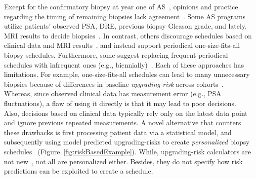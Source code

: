 Except for the confirmatory biopsy at year one of AS~\citep{bokhorst2015compliance}, opinions and practice regarding the timing of remaining biopsies lack agreement~\citep{nieboer2018active}. Some AS programs utilize patients' observed PSA, DRE, previous biopsy Gleason grade, and lately, MRI results to decide biopsies~\citep{kasivisvanathan2020magnetic,bul2013active,nieboer2018active}. In contrast, others discourage schedules based on clinical data and MRI results~\citep{chesnut2019role,loeb2014heterogeneity}, and instead support periodical one-size-fits-all biopsy schedules. Furthermore, some suggest replacing frequent periodical schedules with infrequent ones (e.g., biennially)~\citep{inoue2018comparative,de2017estimating}. Each of these approaches has limitations. For example, one-size-fits-all schedules can lead to many unnecessary biopsies because of differences in baseline \emph{upgrading-risk} across cohorts~\citep{inoue2018comparative}. Whereas, since observed clinical data has measurement error (e.g., PSA fluctuations), a flaw of using it directly is that it may lead to poor decisions. Also, decisions based on clinical data typically rely only on the latest data point and ignore previous repeated measurements. A novel alternative that counters these drawbacks is first processing patient data via a statistical model, and subsequently using model predicted upgrading-risks to create \emph{personalized} biopsy schedules~\citep{nieboer2018active} (Figure~\ref{fig:riskBasedExample}). While, upgrading-risk calculators are not new~\citep{coley2017prediction,ankerst2015precision,partin1993use,makarov2007updated}, not all are personalized either. Besides, they do not specify how risk predictions can be exploited to create a schedule.

